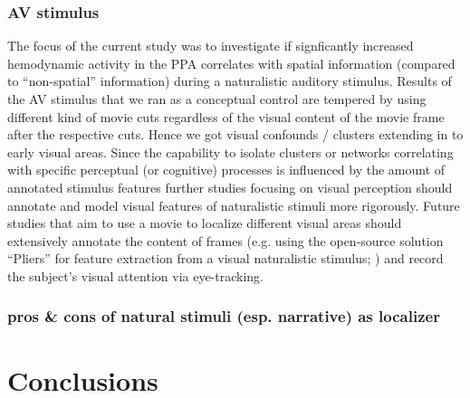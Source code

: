 \documentclass[english]{article}
\begin{document}
\subsubsection{AV stimulus}



The focus of the current study was to investigate if signficantly increased
hemodynamic activity in the PPA correlates with spatial information (compared to
``non-spatial'' information) during a naturalistic auditory stimulus.
Results of the AV stimulus that we ran as a conceptual control are tempered by
using different kind of movie cuts regardless of the visual content of the movie
frame after the respective cuts.
Hence we got visual confounds / clusters extending in to early visual areas.
Since the capability to isolate clusters or networks correlating with specific
perceptual (or cognitive) processes is influenced by the amount of annotated
stimulus features further studies focusing on visual perception should annotate
and model visual features of naturalistic stimuli more rigorously.
Future studies that aim to use a movie to localize different visual areas should
extensively annotate the content of frames (e.g. using the open-source solution
``Pliers'' for feature extraction from a visual naturalistic stimulus;
\citep{mcnamara2017developing}) and record the subject's visual attention via
eye-tracking.


\subsubsection{pros \& cons of natural stimuli (esp. narrative) as localizer}





\section{Conclusions}


\end{document}

